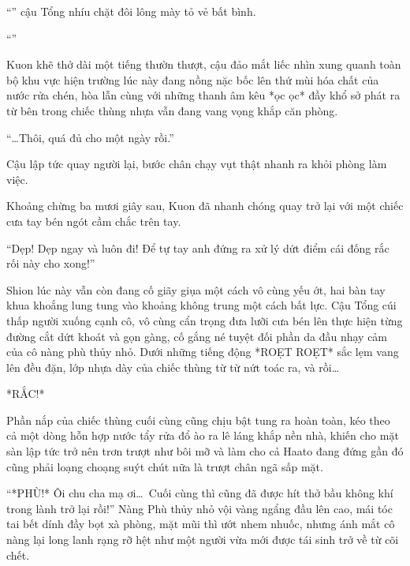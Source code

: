 \documentclass[../main.tex]{subfiles}
\begin{document}
``'' cậu Tổng nhíu chặt đôi lông mày tỏ vẻ bất bình.

``''

Kuon khẽ thở dài một tiếng thườn thượt, cậu đảo mắt liếc nhìn xung quanh toàn bộ khu vực hiện trường lúc này đang nồng nặc bốc lên thứ mùi hóa chất của nước rửa chén, hòa lẫn cùng với những thanh âm kêu *ọc ọc* đầy khổ sở phát ra từ bên trong chiếc thùng nhựa vẫn đang vang vọng khắp căn phòng.

``\dots Thôi, quá đủ cho một ngày rồi.''

Cậu lập tức quay người lại, bước chân chạy vụt thật nhanh ra khỏi phòng làm việc.

Khoảng chừng ba mươi giây sau, Kuon đã nhanh chóng quay trở lại với một chiếc cưa tay bén ngót cầm chắc trên tay.

``Dẹp! Dẹp ngay và luôn đi! Để tự tay anh đứng ra xử lý dứt điểm cái đống rắc rối này cho xong!''

Shion lúc này vẫn còn đang cố giãy giụa một cách vô cùng yếu ớt, hai bàn tay khua khoắng lung tung vào khoảng không trung một cách bất lực. Cậu Tổng cúi thấp người xuống cạnh cô, vô cùng cẩn trọng đưa lưỡi cưa bén lên thực hiện từng đường cắt dứt khoát và gọn gàng, cố gắng né tuyệt đối phần da đầu nhạy cảm của cô nàng phù thủy nhỏ. Dưới những tiếng động *ROẸT ROẸT* sắc lẹm vang lên đều đặn, lớp nhựa dày của chiếc thùng từ từ nứt toác ra, và rồi\dots

*RẮC!*

Phần nắp của chiếc thùng cuối cùng cũng chịu bật tung ra hoàn toàn, kéo theo cả một dòng hỗn hợp nước tẩy rửa đổ ào ra lê láng khắp nền nhà, khiến cho mặt sàn lập tức trở nên trơn trượt như bôi mỡ và làm cho cả Haato đang đứng gần đó cũng phải loạng choạng suýt chút nữa là trượt chân ngã sấp mặt.

``*PHÙ!* Ôi chu cha mạ ơi\dots\ Cuối cùng thì cũng đã được hít thở bầu không khí trong lành trở lại rồi!'' Nàng Phù thủy nhỏ vội vàng ngẩng đầu lên cao, mái tóc tai bết dính đầy bọt xà phòng, mặt mũi thì ướt nhem nhuốc, nhưng ánh mắt cô nàng lại long lanh rạng rỡ hệt như một người vừa mới được tái sinh trở về từ cõi chết.
\end{document}

